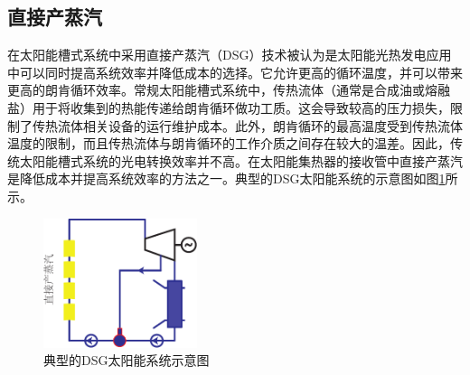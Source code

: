 \subsection{直接产蒸汽}

在太阳能槽式系统中采用直接产蒸汽（DSG）技术被认为是太阳能光热发电应用中可以同时提高系统效率并降低成本的选择。它允许更高的循环温度，并可以带来更高的朗肯循环效率。常规太阳能槽式系统中，传热流体（通常是合成油或熔融盐）用于将收集到的热能传递给朗肯循环做功工质。这会导致较高的压力损失，限制了传热流体相关设备的运行维护成本。此外，朗肯循环的最高温度受到传热流体温度的限制，而且传热流体与朗肯循环的工作介质之间存在较大的温差。因此，传统太阳能槽式系统的光电转换效率并不高。在太阳能集热器的接收管中直接产蒸汽是降低成本并提高系统效率的方法之一。典型的DSG太阳能系统的示意图如图\ref{fig:DSG}所示。

\begin{figure}[!ht]
\centering 
\includegraphics[width=0.4\textwidth]{fig/DSG}
\caption{典型的DSG太阳能系统示意图}\label{fig:DSG}
\end{figure}

